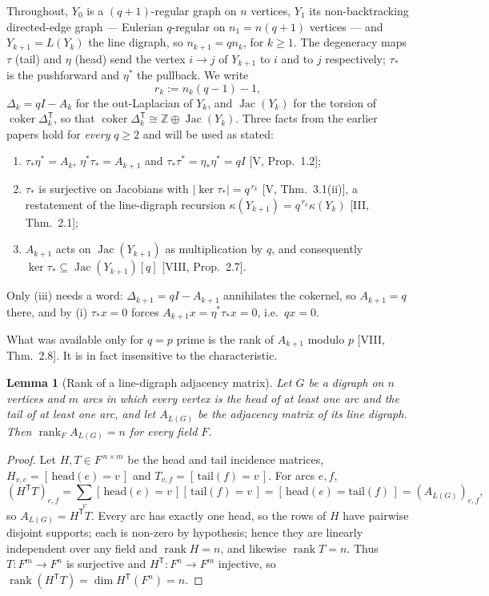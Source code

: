 \documentclass[11pt]{amsart}
\numberwithin{equation}{section}
\newtheorem{lemma}[theorem]{Lemma}
\theoremstyle{definition}
\theoremstyle{remark}
\newcommand{\Z}{\mathbb{Z}}
\newcommand{\Jac}{\operatorname{Jac}}
\newcommand{\coker}{\operatorname{coker}}
\newcommand{\rank}{\operatorname{rank}}
\newcommand{\ta}{\tau_*}
\newcommand{\etp}{\eta^*}
\begin{document}
Throughout, $Y_0$ is a $(q+1)$-regular graph on $n$ vertices, $Y_1$ its non-backtracking
directed-edge graph --- Eulerian $q$-regular on $n_1=n(q+1)$ vertices --- and
$Y_{k+1}=L(Y_k)$ the line digraph, so $n_{k+1}=qn_k$, for $k\ge1$. The degeneracy maps
$\tau$ (tail) and $\eta$ (head) send the vertex $i\to j$ of $Y_{k+1}$ to $i$ and to $j$
respectively; $\ta$ is the pushforward and $\etp$ the pullback. We write
\[
r_k:=n_k(q-1)-1 ,
\]
$\Delta_k=qI-A_k$ for the out-Laplacian of $Y_k$, and $\Jac(Y_k)$ for the torsion of
$\coker\Delta_k^{\mathsf T}$, so that $\coker\Delta_k^{\mathsf T}\cong\Z\oplus\Jac(Y_k)$.
Three facts from the earlier papers hold for \emph{every} $q\ge2$ and will be used as
stated:
\begin{enumerate}
\item[(i)] $\ta\etp=A_k$, $\etp\ta=A_{k+1}$ and $\ta\tau^*=\eta_*\etp=qI$
      [V, Prop.~1.2];
\item[(ii)] $\ta$ is surjective on Jacobians with $|\ker\ta|=q^{\,r_k}$
      [V, Thm.~3.1(ii)], a restatement of the line-digraph recursion
      $\kappa(Y_{k+1})=q^{\,r_k}\kappa(Y_k)$ [III, Thm.~2.1];
\item[(iii)] $A_{k+1}$ acts on $\Jac(Y_{k+1})$ as multiplication by $q$, and consequently
      $\ker\ta\subseteq\Jac(Y_{k+1})[q]$ [VIII, Prop.~2.7].
\end{enumerate}
Only (iii) needs a word: $\Delta_{k+1}=qI-A_{k+1}$ annihilates the cokernel, so $A_{k+1}=q$
there, and by (i) $\ta x=0$ forces $A_{k+1}x=\etp\ta x=0$, i.e.\ $qx=0$.

What was available only for $q=p$ prime is the rank of $A_{k+1}$ modulo $p$
[VIII, Thm.~2.8]. It is in fact insensitive to the characteristic.

\begin{lemma}[Rank of a line-digraph adjacency matrix]\label{lem:rank}
Let $G$ be a digraph on $n$ vertices and $m$ arcs in which every vertex is the head of at
least one arc and the tail of at least one arc, and let $A_{L(G)}$ be the adjacency matrix
of its line digraph. Then $\rank_F A_{L(G)}=n$ for every field $F$.
\end{lemma}

\begin{proof}
Let $H,T\in F^{\,n\times m}$ be the head and tail incidence matrices,
$H_{v,e}=[\,\mathrm{head}(e)=v\,]$ and $T_{v,f}=[\,\mathrm{tail}(f)=v\,]$. For arcs $e,f$,
\[
(H^{\mathsf T}T)_{e,f}=\sum_{v}[\,\mathrm{head}(e)=v\,][\,\mathrm{tail}(f)=v\,]
=[\,\mathrm{head}(e)=\mathrm{tail}(f)\,]=(A_{L(G)})_{e,f},
\]
so $A_{L(G)}=H^{\mathsf T}T$. Every arc has exactly one head, so the rows of $H$ have
pairwise disjoint supports; each is non-zero by hypothesis; hence they are linearly
independent over any field and $\rank H=n$, and likewise $\rank T=n$. Thus
$T\colon F^m\to F^n$ is surjective and $H^{\mathsf T}\colon F^n\to F^m$ injective, so
$\rank(H^{\mathsf T}T)=\dim H^{\mathsf T}(F^n)=n$.
\end{proof}
\end{document}
